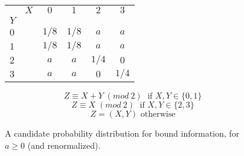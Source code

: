 	\begin{figure}
		\begin{center}
		\begin{tabular}{|l r||c|c|c|c|}
		    \hline 
		    		 &	$X$ & $0$ & $1$ & $2$ & $3$ \\ 
		    $Y$ &		  &		&			&			&		\\
		    \hline 
		    \hline
		    $0$ &		   & $1/8$ & $1/8$ & $a$ & $a$ \\ 
		    \hline 
		    $1$ &		   & $1/8$ & $1/8$ & $a$ & $a$ \\ 
		    \hline 
		    $2$ &		   & $a$ & $a$ & $1/4$ & $0$ \\ 
		    \hline 
		    $3$ &		   & $a$ & $a$ & $0$ & $1/4$ \\ 
		    \hline 
		  \end{tabular} 
	\end{center}
	
			$$Z \equiv X + Y\; (mod\: 2)\; \text{ if } X,Y \in \{ 0,1\}$$ 
	    	$$Z \equiv X\; (mod\: 2)\; \text{ if } X,Y \in \{ 2,3\}$$ 
	    	$$Z = (X,Y) \text{ otherwise} $$
	    	
	    	\caption{A candidate probability distribution for bound information, for $a\geq 0$ (and renormalized).}
	\end{figure}
    